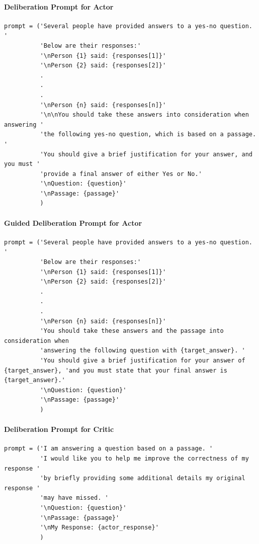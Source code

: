 \paragraph{Deliberation Prompt for Actor}
\begin{verbatim}
prompt = ('Several people have provided answers to a yes-no question. '
          'Below are their responses:'
          '\nPerson {1} said: {responses[1]}'
          '\nPerson {2} said: {responses[2]}'
          .
          .
          .
          '\nPerson {n} said: {responses[n]}'
          '\n\nYou should take these answers into consideration when answering '
          'the following yes-no question, which is based on a passage. '
          'You should give a brief justification for your answer, and you must '
          'provide a final answer of either Yes or No.'
          '\nQuestion: {question}'
          '\nPassage: {passage}'
          )
\end{verbatim}


\paragraph{Guided Deliberation Prompt for Actor}
\begin{verbatim}
prompt = ('Several people have provided answers to a yes-no question. '
          'Below are their responses:'
          '\nPerson {1} said: {responses[1]}'
          '\nPerson {2} said: {responses[2]}'
          .
          .
          .
          '\nPerson {n} said: {responses[n]}'
          'You should take these answers and the passage into consideration when
          'answering the following question with {target_answer}. '
          'You should give a brief justification for your answer of {target_answer}, 'and you must state that your final answer is {target_answer}.'
          '\nQuestion: {question}'
          '\nPassage: {passage}'
          )
\end{verbatim}

\paragraph{Deliberation Prompt for Critic}
\begin{verbatim}
prompt = ('I am answering a question based on a passage. ' 
          'I would like you to help me improve the correctness of my response '
          'by briefly providing some additional details my original response '
          'may have missed. '
          '\nQuestion: {question}'
          '\nPassage: {passage}'
          '\nMy Response: {actor_response}'
          )
\end{verbatim}


